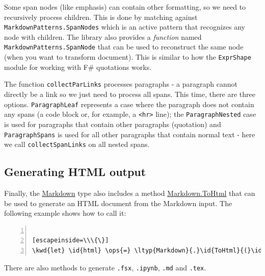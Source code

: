 \documentclass{article}
\newcommand{\id}[1]{\textcolor{black}{#1}}
\newcommand{\kwd}[1]{\textcolor{navy}{#1}}
\newcommand{\ops}[1]{\textcolor{purple}{#1}}
\begin{document}
Some span nodes (like emphasis) can contain other formatting, so we need to recursively
process children. This is done by matching against \texttt{MarkdownPatterns.SpanNodes} which is an active
pattern that recognizes any node with children. The library also provides a \emph{function}
named \texttt{MarkdownPatterns.SpanNode} that can be used to reconstruct the same node (when you want
to transform document). This is similar to how the \texttt{ExprShape} module for working with
F\# quotations works.


The function \texttt{collectParLinks} processes paragraphs - a paragraph cannot directly be a
link so we just need to process all spans. This time, there are three options.
\texttt{ParagraphLeaf} represents a case where the paragraph does not contain any spans
(a code block or, for example, a \texttt{<hr>} line); the \texttt{ParagraphNested} case is used for paragraphs
that contain other paragraphs (quotation) and \texttt{ParagraphSpans} is used for all other
paragraphs that contain normal text - here we call \texttt{collectSpanLinks} on all nested spans.
\subsection*{Generating HTML output}



Finally, the \href{https://fsprojects.github.io/FSharp.Formatting/reference/fsharp-formatting-markdown-markdown.html}{Markdown} type also includes a method \href{https://fsprojects.github.io/FSharp.Formatting/reference/fsharp-formatting-markdown-markdown.html\#ToHtml}{Markdown.ToHtml} that can be used
to generate an HTML document from the Markdown input. The following example shows how to call it:
\begin{lstlisting}[numbers=left]

[escapeinside=\\\{\}]
\kwd{let} \id{html} \ops{=} \ltyp{Markdown}{.}\id{ToHtml}{(}\id{parsed}{)}

\end{lstlisting}



There are also methods to generate \texttt{.fsx}, \texttt{.ipynb}, \texttt{.md} and \texttt{.tex}.
\end{document}
